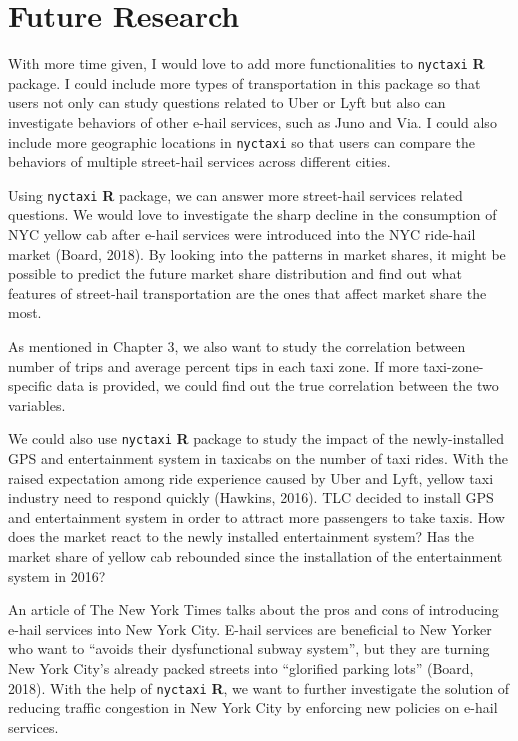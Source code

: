\documentclass[12pt,twoside]{reedthesis}
\theoremstyle{definition}
\theoremstyle{definition}
\theoremstyle{definition}
\theoremstyle{remark}
\begin{document}
\section{Future Research}\label{future-research}

With more time given, I would love to add more functionalities to
\texttt{nyctaxi} \textbf{R} package. I could include more types of
transportation in this package so that users not only can study
questions related to Uber or Lyft but also can investigate behaviors of
other e-hail services, such as Juno and Via. I could also include more
geographic locations in \texttt{nyctaxi} so that users can compare the
behaviors of multiple street-hail services across different cities.

Using \texttt{nyctaxi} \textbf{R} package, we can answer more
street-hail services related questions. We would love to investigate the
sharp decline in the consumption of NYC yellow cab after e-hail services
were introduced into the NYC ride-hail market (Board, 2018). By looking
into the patterns in market shares, it might be possible to predict the
future market share distribution and find out what features of
street-hail transportation are the ones that affect market share the
most.

As mentioned in Chapter 3, we also want to study the correlation between
number of trips and average percent tips in each taxi zone. If more
taxi-zone-specific data is provided, we could find out the true
correlation between the two variables.

We could also use \texttt{nyctaxi} \textbf{R} package to study the
impact of the newly-installed GPS and entertainment system in taxicabs
on the number of taxi rides. With the raised expectation among ride
experience caused by Uber and Lyft, yellow taxi industry need to respond
quickly (Hawkins, 2016). TLC decided to install GPS and entertainment
system in order to attract more passengers to take taxis. How does the
market react to the newly installed entertainment system? Has the market
share of yellow cab rebounded since the installation of the
entertainment system in 2016?

An article of The New York Times talks about the pros and cons of
introducing e-hail services into New York City. E-hail services are
beneficial to New Yorker who want to ``avoids their dysfunctional subway
system'', but they are turning New York City's already packed streets
into ``glorified parking lots'' (Board, 2018). With the help of
\texttt{nyctaxi} \textbf{R}, we want to further investigate the solution
of reducing traffic congestion in New York City by enforcing new
policies on e-hail services.
\end{document}
